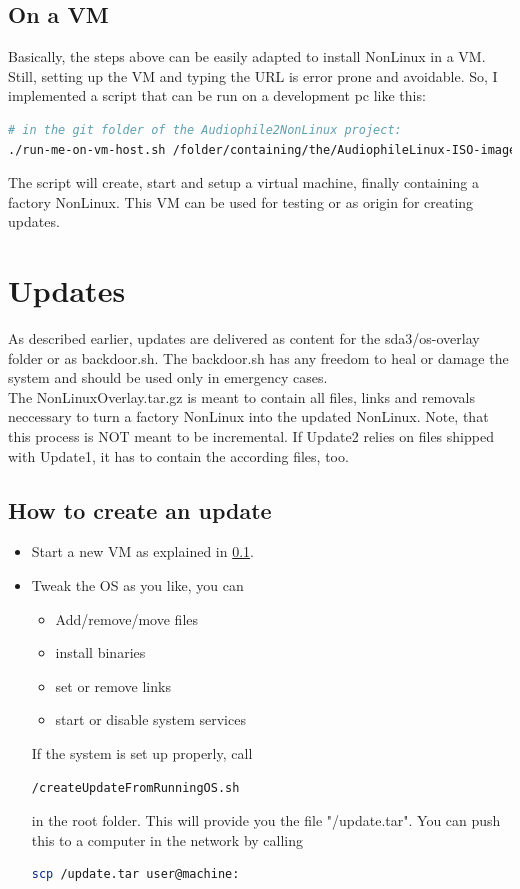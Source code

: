 \documentclass[10pt,a4paper]{article}
\begin{document}
\subsection{On a VM}
\label{vm-install}
Basically, the steps above can be easily adapted to install NonLinux in a VM. Still, setting up the VM and typing the URL is error prone and avoidable. So, I implemented a script that can be run on a development pc like this:
\begin{lstlisting}[language=bash,breaklines=true]
# in the git folder of the Audiophile2NonLinux project:
./run-me-on-vm-host.sh /folder/containing/the/AudiophileLinux-ISO-image
\end{lstlisting}
The script will create, start and setup a virtual machine, finally containing a factory NonLinux.
This VM can be used for testing or as origin for creating updates.
\section{Updates}
As described earlier, updates are delivered as content for the sda3/os-overlay folder or as backdoor.sh.
The backdoor.sh has any freedom to heal or damage the system and should be used only in emergency cases.\\
The NonLinuxOverlay.tar.gz is meant to contain all files, links and removals neccessary to turn a factory NonLinux into the updated NonLinux. Note, that this process is NOT meant to be incremental. If Update2 relies on files shipped with Update1, it has to contain the according files, too.\\
\subsection{How to create an update}
\begin{itemize}
\item Start a new VM as explained in \ref{vm-install}.
\item Tweak the OS as you like, you can
\begin{itemize}
\item Add/remove/move files
\item install binaries
\item set or remove links
\item start or disable system services
\end{itemize}
If the system is set up properly, call 
\begin{lstlisting}[language=bash,breaklines=true]
/createUpdateFromRunningOS.sh
\end{lstlisting}
in the root folder. This will provide you the file "/update.tar". You can push this to a computer in the network by calling
\begin{lstlisting}[language=bash,breaklines=true]
scp /update.tar user@machine:
\end{lstlisting}
\end{itemize}
\end{document}
